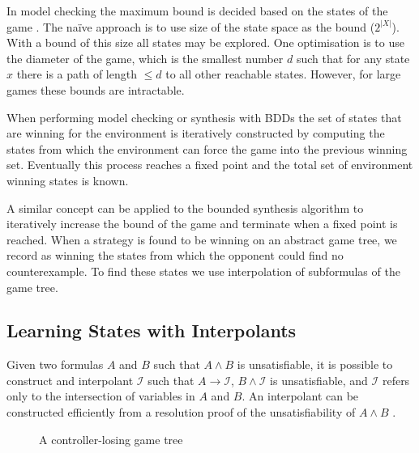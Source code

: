 \documentclass{llncs}
\begin{document}
In model checking the maximum bound is decided based on the states of the game
\cite{biere1999}. The na\"ive approach is to use size of the state space as the
bound ($2^{|X|}$). With a bound of this size all states may be explored. One
optimisation is to use the diameter of the game, which is the smallest number
$d$ such that for any state $x$ there is a path of length $\leq d$ to all other
reachable states. However, for large games these bounds are intractable.

When performing model checking or synthesis with BDDs \cite{burch1990} the set
of states that are winning for the environment is iteratively constructed by
computing the states from which the environment can force the game into the
previous winning set. Eventually this process reaches a fixed point and the
total set of environment winning states is known.

A similar concept can be applied to the bounded synthesis algorithm to
iteratively increase the bound of the game and terminate when a fixed point is
reached. When a strategy is found to be winning on an abstract game tree, we
record as winning the states from which the opponent could find no
counterexample. To find these states we use interpolation of subformulas of the
game tree.

\subsection{Learning States with Interpolants}

Given two formulas $A$ and $B$ such that $A \land B$ is unsatisfiable, it is
possible to construct and interpolant $\mathcal{I}$ such that $A \to
\mathcal{I}$, $B \land \mathcal{I}$ is unsatisfiable, and $\mathcal{I}$ refers
only to the intersection of variables in $A$ and $B$. An interpolant can be
constructed efficiently from a resolution proof of the unsatisfiability of $A
\land B$ \cite{pudlak1997}.

\begin{figure}
    \centering
    \caption{A controller-losing game tree}
    \label{fig:interpolatetree}
\end{figure}
\end{document}
